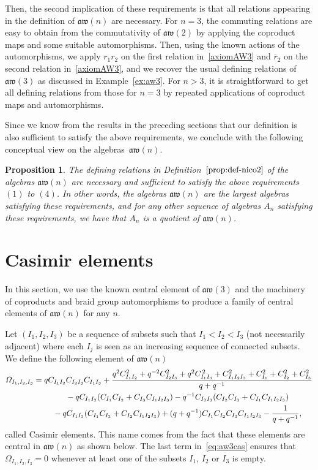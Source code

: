 \documentclass[pdftex]{sigma}
\numberwithin{equation}{section}
\newtheorem{prop}[theo]{Proposition}
\theoremstyle{definition}
\newcommand{\rb}{\overline{r}}
\newcommand{\aw}{\mathfrak{aw}(n)}
\begin{document}
Then, the second implication of these requirements is that all relations appearing in the definition of $\aw$ are necessary. For $n=3$, the commuting relations are easy to obtain from the commutativity of $\mathfrak{aw}(2)$ by applying the coproduct maps and some suitable automorphisms. Then, using the known actions of the automorphisms, we apply $r_1r_2$ on the first relation in~\eqref{axiomAW3} and $\rb_2$ on the second relation in~\eqref{axiomAW3}, and we recover the usual defining relations of $\mathfrak{aw}(3)$ as discussed in Example~\ref{ex:aw3}. For $n>3$, it is straightforward to get all defining relations from those for $n=3$ by repeated applications of coproduct maps and automorphisms.

Since we know from the results in the preceding sections that our definition is also sufficient to satisfy the above requirements, we conclude with the following conceptual view on the algebras~$\aw$.
\begin{prop}%
The defining relations in Definition~$\ref{prop:def-nico2}$ of the algebras $\aw$ are necessary and sufficient to satisfy the above requirements $(1)$ to $(4)$. In other words, the algebras $\aw$ are the largest algebras satisfying these requirements, and for any other sequence of algebras $A_n$ satisfying these requirements, we have that $A_n$ is a quotient of $\aw$.
\end{prop}


\section{Casimir elements}\label{sec-Cas}
In this section, we use the known central element of $\mathfrak{aw}(3)$ and the machinery of coproducts and braid group automorphisms to produce a family of central elements of $\aw$ for any $n$.

\medskip
Let $(I_1,I_2,I_3)$ be a sequence of subsets such that $I_1<I_2<I_3$ (not necessarily adjacent) where each $I_j$ is seen as an increasing sequence of connected subsets. We define the following element of $\aw$
\begin{gather}
 \varOmega_{I_1,I_2,I_3} = qC_{I_1I_2}C_{I_2I_3}C_{I_1I_3}+\frac{q^{2}C_{I_1I_2}^{2}+q^{-2}C_{I_2I_3}^{2}+q^{2}C_{I_1I_3}^{\,2}+C_{I_1I_2I_3}^{2} +
 C_{I_1}^{2}+C_{I_2}^{2}+C_{I_3}^{2} }{q+q^{-1}}\nonumber \\
\hphantom{\varOmega_{I_1,I_2,I_3} =}{}-qC_{I_1I_2}(C_{I_1}C_{I_2}+C_{I_3}C_{I_1I_2I_3}) -q^{-1}C_{I_2I_3}(C_{I_2}C_{I_3}+C_{I_1}C_{I_1I_2I_3}) \nonumber \\
\hphantom{\varOmega_{I_1,I_2,I_3} =}{}
-qC_{I_1I_3}(C_{I_1}C_{I_3}+C_{I_2}C_{I_1I_2I_3})+(q+q^{-1})C_{I_1}C_{I_2}C_{I_3}C_{I_1I_2I_3}
-\frac{1}{q+q^{-1}} ,\label{eq:aw3cas}
\end{gather}
called Casimir elements. This name comes from the fact that these elements are central in $\aw$ as shown below.
The last term in~\eqref{eq:aw3cas} ensures that $\varOmega_{I_1,I_2,I_3}=0$ whenever at least one of the subsets $I_1$, $I_2$ or $I_3$ is empty.
\end{document}
